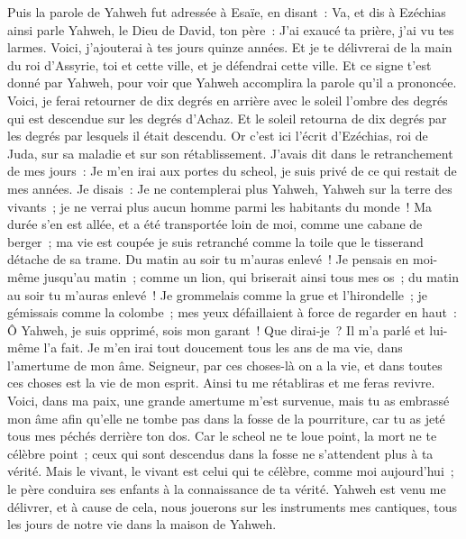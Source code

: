 \begin{multicols}{2}
Puis la parole de Yahweh fut adressée à Esaïe, en disant~:
Va, et dis à Ezéchias ainsi parle Yahweh, le Dieu de David, ton père~: J'ai exaucé ta prière, j'ai vu tes larmes. Voici, j'ajouterai à tes jours quinze années.
Et je te délivrerai de la main du roi d'Assyrie, toi et cette ville, et je défendrai cette ville.
Et ce signe t'est donné par Yahweh, pour voir que Yahweh accomplira la parole qu'il a prononcée.
Voici, je ferai retourner de dix degrés en arrière avec le soleil l'ombre des degrés qui est descendue sur les degrés d'Achaz. Et le soleil retourna de dix degrés par les degrés par lesquels il était descendu.
Or c'est ici l'écrit d'Ezéchias, roi de Juda, sur sa maladie et sur son rétablissement.
J'avais dit dans le retranchement de mes jours~: Je m'en irai aux portes du scheol, je suis privé de ce qui restait de mes années.
Je disais~: Je ne contemplerai plus Yahweh, Yahweh sur la terre des vivants~; je ne verrai plus aucun homme parmi les habitants du monde~!
Ma durée s'en est allée, et a été transportée loin de moi, comme une cabane de berger~; ma vie est coupée je suis retranché comme la toile que le tisserand détache de sa trame. Du matin au soir tu m'auras enlevé~!
Je pensais en moi-même jusqu'au matin~; comme un lion, qui briserait ainsi tous mes os~; du matin au soir tu m'auras enlevé~!
Je grommelais comme la grue et l'hirondelle~; je gémissais comme la colombe~; mes yeux défaillaient à force de regarder en haut~: Ô Yahweh, je suis opprimé, sois mon garant~!
Que dirai-je~? Il m'a parlé et lui-même l'a fait. Je m'en irai tout doucement tous les ans de ma vie, dans l'amertume de mon âme.
Seigneur, par ces choses-là on a la vie, et dans toutes ces choses est la vie de mon esprit. Ainsi tu me rétabliras et me feras revivre.
Voici, dans ma paix, une grande amertume m'est survenue, mais tu as embrassé mon âme afin qu'elle ne tombe pas dans la fosse de la pourriture, car tu as jeté tous mes péchés derrière ton dos.
Car le scheol ne te loue point, la mort ne te célèbre point~; ceux qui sont descendus dans la fosse ne s'attendent plus à ta vérité.
Mais le vivant, le vivant est celui qui te célèbre, comme moi aujourd'hui~; le père conduira ses enfants à la connaissance de ta vérité.
Yahweh est venu me délivrer, et à cause de cela, nous jouerons sur les instruments mes cantiques, tous les jours de notre vie dans la maison de Yahweh.

\end{multicols}
